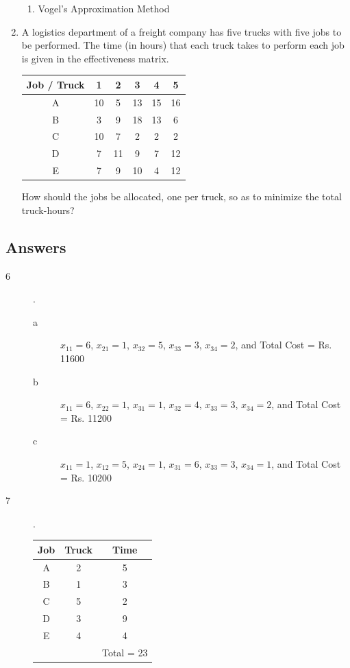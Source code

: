 \begin{enumerate}
\begin{enumerate}
			\item Vogel's Approximation Method
		\end{enumerate}
	\item A  logistics department of a freight company has five trucks with five jobs to be performed. The time (in hours) that each truck takes to perform each job is given in the effectiveness matrix.
		\begin{center}
			\begin{tabular}{c | c | c | c | c | c}
				Job / Truck & 1 & 2 & 3 & 4 & 5\\
				\hline
				A & 10 & 5 & 13 & 15 & 16 \\
				\hline
				B & 3 & 9 & 18 & 13 & 6 \\
				\hline
				C & 10 & 7 & 2 & 2 & 2 \\
				\hline
				D & 7 & 11 & 9 & 7 & 12 \\
				\hline
				E & 7 & 9 & 10 & 4 & 12
			\end{tabular}
		\end{center}
	How should the jobs be allocated, one per truck, so as to minimize the total truck-hours?
\end{enumerate}
%
\subsection{Answers}
\begin{description}
	\item [6]. \begin{description}
		\item [a] $x_{11} = 6$, $x_{21} = 1$, $x_{32} = 5$, $x_{33} = 3$, $x_{34} = 2$, and Total Cost = Rs. 11600
		\item [b] $x_{11} = 6$, $x_{22} = 1$, $x_{31} = 1$, $x_{32} = 4$, $x_{33} = 3$, $x_{34} = 2$, and Total Cost = Rs. 11200
		\item [c] $x_{11} = 1$, $x_{12} = 5$, $x_{24} = 1$, $x_{31} = 6$, $x_{33} = 3$, $x_{34} = 1$, and Total Cost = Rs. 10200
	\end{description}
	\item [7]. \begin{center}
		\begin{tabular}{| c | c | c |}
			\hline
			Job & Truck & Time\\
			\hline
			A & 2 & 5\\
			\hline
			B & 1 & 3\\ 
			\hline
			C & 5 & 2\\ 
			\hline
			D & 3 & 9\\ 
			\hline
			E & 4 & 4\\ 
			\hline
			& & Total = 23
		\end{tabular}
	\end{center}
\end{description}